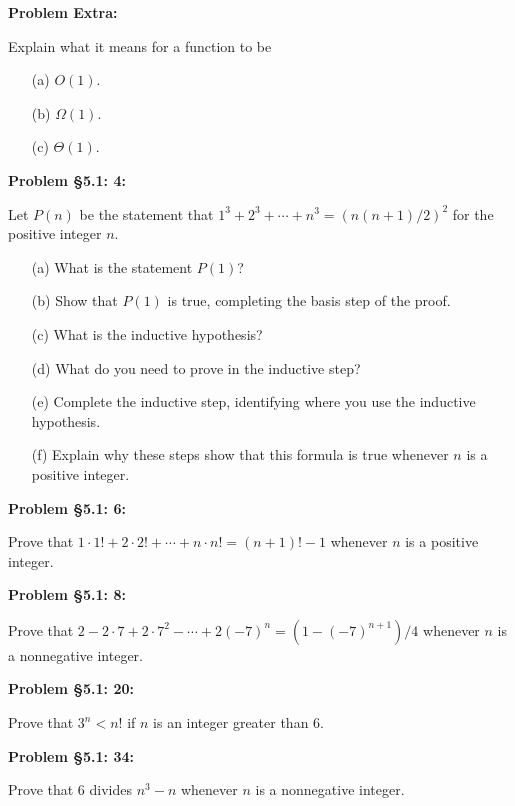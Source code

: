 \documentclass{article}
\newenvironment{problem}[1]
    {\begin{mdframed}[default]
    \textbf{Problem #1:}
    }
    {\end{mdframed}
    }
\begin{document}
\begin{problem}{Extra}
Explain what it means for a function to be
\begin{enumerate}
    \item[(a)] $O(1)$.
    \item[(b)] $\Omega(1)$.
    \item[(c)] $\Theta(1)$.
\end{enumerate}
\end{problem}

\begin{problem}{\S 5.1: 4}
Let $P(n)$ be the statement that $1^3 + 2^3 + \cdots + n^3 = (n(n+1)/2)^2$ for the positive integer $n$.
\begin{enumerate}
    \item[(a)] What is the statement $P(1)$?
    \item[(b)] Show that $P(1)$ is true, completing the basis step of the proof.
    \item[(c)] What is the inductive hypothesis?
    \item[(d)] What do you need to prove in the inductive step?
    \item[(e)] Complete the inductive step, identifying where you use the inductive hypothesis.
    \item[(f)] Explain why these steps show that this formula is true whenever $n$ is a positive integer.
\end{enumerate}
\end{problem}

\begin{problem}{\S 5.1: 6}
Prove that $1 \cdot 1! + 2 \cdot 2! + \cdots + n \cdot n! = (n+1)!-1$ whenever $n$ is a positive integer.
\end{problem}

\begin{problem}{\S 5.1: 8}
Prove that $2 - 2 \cdot 7 + 2 \cdot 7^2 - \cdots + 2(-7)^n = (1-(-7)^{n+1})/4$ whenever $n$ is a nonnegative integer.
\end{problem}

\begin{problem}{\S 5.1: 20}
Prove that $3^n < n!$ if $n$ is an integer greater than $6$.
\end{problem}

\begin{problem}{\S 5.1: 34}
Prove that $6$ divides $n^3 - n$ whenever $n$ is a nonnegative integer.
\end{problem}
\end{document}
